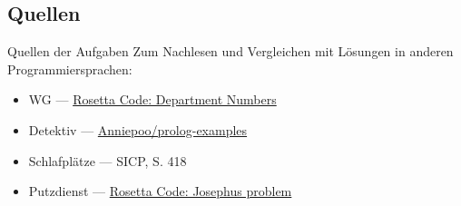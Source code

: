 \documentclass{beamer}
\begin{document}
\subsection{Quellen}

\begin{frame}{Quellen der Aufgaben}
	Zum Nachlesen und Vergleichen mit Lösungen in anderen Programmiersprachen:
	\begin{itemize}
		\item WG --- \href{https://rosettacode.org/wiki/Department_Numbers}{Rosetta Code: Department Numbers}
		\item Detektiv --- \href{https://github.com/Anniepoo/prolog-examples/blob/master/newdetective.pl}{Anniepoo/prolog-examples}
		\item Schlafplätze --- SICP, S. 418
		\item Putzdienst --- \href{https://rosettacode.org/wiki/Josephus_problem}{Rosetta Code: Josephus problem}
	\end{itemize}
\end{frame}

\end{document}
